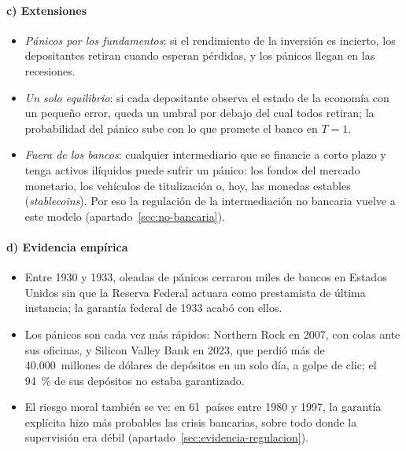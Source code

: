 \documentclass[11pt]{article}
\begin{document}
\paragraph{c) Extensiones}

\begin{itemize}
\item \emph{Pánicos por los fundamentos}: si el rendimiento de la inversión es incierto, los depositantes retiran cuando esperan pérdidas, y los pánicos llegan en las recesiones\nocite{AllenGale1998Optimal}.
\item \emph{Un solo equilibrio}: si cada depositante observa el estado de la economía con un pequeño error, queda un umbral por debajo del cual todos retiran; la probabilidad del pánico sube con lo que promete el banco en $T=1$\nocite{GoldsteinPauzner2005}.
\item \emph{Fuera de los bancos}: cualquier intermediario que se financie a corto plazo y tenga activos ilíquidos puede sufrir un pánico: los fondos del mercado monetario, los vehículos de titulización o, hoy, las monedas estables (\emph{stablecoins}). Por eso la regulación de la intermediación no bancaria vuelve a este modelo (apartado~\ref{sec:no-bancaria}).
\end{itemize}

\paragraph{d) Evidencia empírica}

\begin{itemize}
\item Entre 1930 y 1933, oleadas de pánicos cerraron miles de bancos en Estados Unidos sin que la Reserva Federal actuara como prestamista de última instancia; la garantía federal de 1933 acabó con ellos\nocite{FriedmanSchwartz1963Monetary}.
\item Los pánicos son cada vez más rápidos: Northern Rock en 2007, con colas ante sus oficinas, y Silicon Valley Bank en 2023, que perdió más de 40.000~millones de dólares de depósitos en un solo día, a golpe de clic; el 94~\% de sus depósitos no estaba garantizado\nocite{FED2023SVB}.
\item El riesgo moral también se ve: en 61~países entre 1980 y 1997, la garantía explícita hizo más probables las crisis bancarias, sobre todo donde la supervisión era débil\nocite{DemirgucKuntDetragiache2002} (apartado~\ref{sec:evidencia-regulacion}).
\end{itemize}
\end{document}
